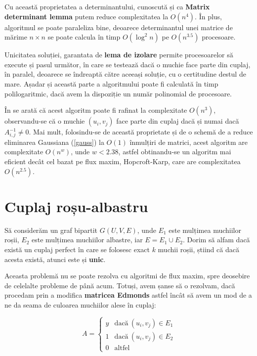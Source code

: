 Cu această proprietatea a determinantului, cunoscută și ca \textbf{Matrix
  determinant lemma} putem reduce complexitatea la $O(n^{4})$. În plus,
algoritmul se poate paraleliza bine, deoarece determinantul unei matrice
de mărime $n \times n$ se poate calcula în timp $O(\log^{2}n)$ pe $O(n^{3.5})$ procesoare.

Unicitatea soluției, garantata de \textbf{lema de izolare} permite procesoarelor
să execute și pasul următor, în care se testează dacă o muchie face parte din
cuplaj, în paralel, deoarece se îndreaptă către aceeași soluție, cu o
certitudine destul de mare. Așadar și această parte a algoritmului poate fi
calculată în timp polilogaritmic, dacă avem la dispoziție un număr polinomial de
procesoare.

În \cite{optimalmatching} se arată că acest algoritm poate fi rafinat la complexitate
$O(n^{3})$, observandu-se că o muchie $(u_{i}, v_{j})$ face parte din cuplaj dacă și
numai dacă $A^{-1}_{i, j} \neq 0$. Mai mult, folosindu-se de această proprietate și
de o schemă de a reduce eliminarea Gaussiana (\ref{gauss}) la $O(1)$ înmulțiri de matrici,
acest algoritm are complexitate $O(n^{w})$, unde $w < 2.38$, astfel obtinandu-se un
algoritm mai eficient decât cel bazat pe flux maxim, Hopcroft-Karp, care are complexitatea
$O(n^{2.5})$.

\pagebreak

\section{Cuplaj roșu-albastru}
\label{redbluematching}

Să considerăm un graf bipartit $G(U, V, E)$, unde $E_{1}$ este mulțimea
muchiilor roșii, $E_{2}$ este mulțimea muchiilor albastre, iar
$E = E_{1} \cup E_{2}$. Dorim să alfam dacă există un cuplaj perfect
în care se folosesc exact $k$ muchii roșii, știind că dacă acesta există, atunci
este și \textbf{unic}. \par

Aceasta problemă nu se poate rezolva cu algoritmi de flux maxim, spre deosebire
de celelalte probleme de până acum. Totuși, avem șanse să o rezolvam, dacă
procedam prin a modifica \textbf{matricea Edmonds} astfel încât să avem un mod
de a ne da seama de culoarea muchiilor alese în cuplaj:

\begin{equation}
  A=
  \begin{cases}
    y & \text{dacă}\ (u_{i}, v_{j}) \in E_{1} \\
    1 & \text{dacă}\ (u_{i}, v_{j}) \in E_{2} \\
    0 & \text{altfel}
  \end{cases}
\end{equation}


